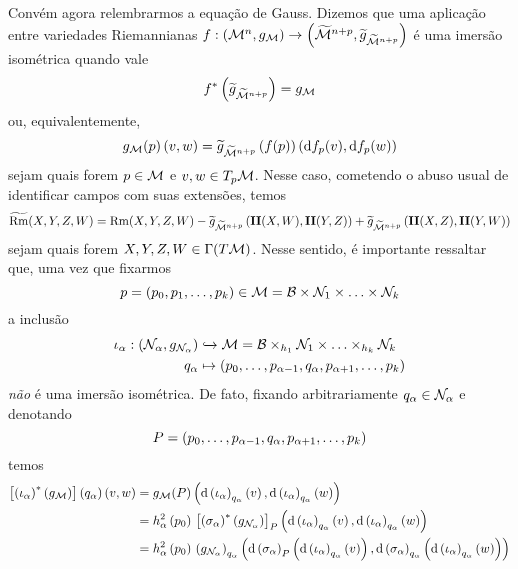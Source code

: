 \begin{oobs}
Convém agora relembrarmos a equação de Gauss. Dizemos que uma aplicação entre variedades Riemannianas $f: \left( \mathcal{M}^n, g_{\mathcal{M}}  \right) \to \left( \widetilde{\mathcal{M}}^{n+p}, \widetilde{g}_{\widetilde{\mathcal{M}}^{n+p}} \right)$ é uma imersão isométrica quando vale
\[
f^{*}\left(  \widetilde{g}_{\widetilde{\mathcal{M}}^{n+p}}  \right) =  g_{\mathcal{M}} 
\]
ou, equivalentemente, 
\[
g_{\mathcal{M}}(p) \left(  v, w  \right) = \widetilde{g}_{\widetilde{\mathcal{M}}^{n+p}}\left( f(p) \right) \left(  \mathrm{d} f_p(v), \mathrm{d} f_p(w)  \right)
\]
sejam quais forem $p \in \mathcal{M}$ e $v, w \in T_{p} \mathcal{M}$. Nesse caso, cometendo o abuso usual de identificar campos com suas extensões, temos
\begin{equation}\label{EquacaoGauss}
\widetilde{\Rm}(X, Y, Z, W) = \Rm(X, Y, Z, W) - \widetilde{g}_{\tioC{\mm}{n+p}} \parent{ \segf(X, W), \segf(Y, Z) } +  \widetilde{g}_{\tioC{\mm}{n+p}} \parent{ \segf(X, Z), \segf(Y, W) } 
\end{equation}
sejam quais forem $X, Y, Z, W \in \Gamma(T \mathcal{M})$. Nesse sentido, é importante ressaltar que, uma vez que fixarmos
\[
p = (p_0, p_1, \ldots, p_k) \in \mathcal{M} = \mathcal{B} \times \mathcal{N}_1 \times \ldots \times \mathcal{N}_{k}
\]
a inclusão 
\[ \begin{aligned}
\iota_{\alpha}: \left(  \mathcal{N}_{\alpha}, g_{\mathcal{N}_{\alpha}}  \right) &\xhookrightarrow{}  \mathcal{M} = \mathcal{B} \times_{h_1} \mathcal{N}_1 \times \ldots \times_{h_k} \mathcal{N}_{k} \\
q_{\alpha} &\mapsto  \left( p_0, \ldots, p_{\alpha - 1}, q_{\alpha}, p_{\alpha + 1}, \ldots, p_k  \right) 
\end{aligned}
\]
\emph{não} é uma imersão isométrica. De fato, fixando arbitrariamente $q_{\alpha} \in \mathcal{N}_{\alpha}$ e denotando
\[
P = \left( p_0, \ldots, p_{\alpha - 1}, q_{\alpha}, p_{\alpha + 1}, \ldots, p_k  \right) 
\] 
temos 
\begin{equation}\label{NaoIsometrica}
\begin{aligned}
\left[\parent{\iota_{\alpha}}^{*}\parent{ g_{\mm}} \right](q_{\alpha})\parent{v, w} &= g_{\mm}(P)\parent{ \dd \parent{\iota_{\alpha}}_{q_{\alpha}}\parent{v}, \dd \parent{\iota_{\alpha}}_{q_{\alpha}}\parent{w} } \\
&= h_{\alpha}^2 \parent{p_0} \, \left[\parent{\sigma_{\alpha}}^{*} \parent{ g_{\nn_{\alpha}}} \right]_{P}\parent{ \dd \parent{\iota_{\alpha}}_{q_{\alpha}}\parent{v}, \dd \parent{\iota_{\alpha}}_{q_{\alpha}}\parent{w} }  \\
&= h_{\alpha}^2 \parent{p_0} \, \parent{g_{\nn_{\alpha}}}_{q_{\alpha}} \parent{ \dd \parent{\sigma_{\alpha}}_{P} \parent{\dd \parent{\iota_{\alpha}}_{q_{\alpha}}\parent{v}},  \dd \parent{\sigma_{\alpha}}_{q_{\alpha}} \parent{\dd \parent{\iota_{\alpha}}_{q_{\alpha}}\parent{w}}} \\

\end{aligned}
\end{equation}
\end{oobs}
